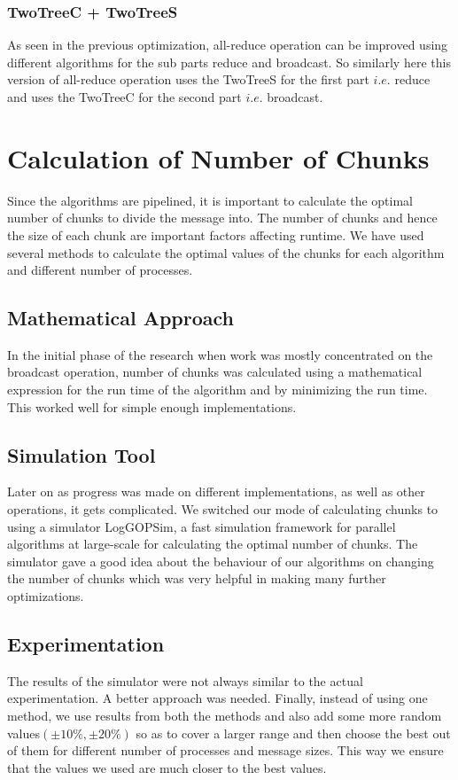 \documentclass[sigplan,review,anonymous]{acmart}\settopmatter{printfolios=true,printccs=false,printacmref=false}
\begin{document}
\subsubsection{TwoTreeC + TwoTreeS}
As seen in the previous optimization, all-reduce operation can be improved using different algorithms for the sub parts reduce and broadcast. So similarly here this version of all-reduce operation uses the TwoTreeS for the first part $i.e.$ reduce and uses the TwoTreeC for the second part $i.e.$ broadcast.

\section{Calculation of Number of Chunks}\label{sec:Chunks}
Since the algorithms are pipelined, it is important to calculate the optimal number of chunks to divide the message into. The number of chunks and hence the size of each chunk are important factors affecting runtime. %
We have used several methods to calculate the optimal values of the chunks for each algorithm and different number of processes.
\subsection{Mathematical Approach}
In the initial phase of the research when work was mostly concentrated on the broadcast operation, number of chunks was calculated using a mathematical expression for the run time of the algorithm and by minimizing the run time. This worked well for simple enough implementations.
\subsection{Simulation Tool}
Later on as progress was made on different implementations, as well as other operations, it gets complicated. We switched our mode of calculating chunks to using a simulator LogGOPSim, a fast simulation framework for parallel algorithms at large-scale for calculating the optimal number of chunks. The simulator gave a good idea about the behaviour of our algorithms on changing the number of chunks which was very helpful in making many further optimizations.
\subsection{Experimentation}
The results of the simulator were not always similar to the actual experimentation. A better approach was needed. Finally, instead of using one method, we use results from both the methods and also add some more random values\((\pm10\%, \pm20\%)\) so as to cover a larger range and then choose the best out of them for different number of processes and message sizes. This way we ensure that the values we used are much closer to the best values.
\end{document}
